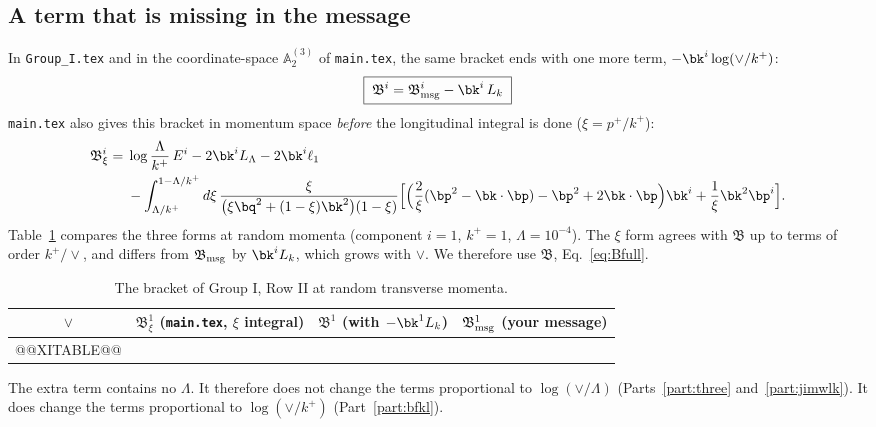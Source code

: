 \subsection{A term that is missing in the message}\label{sec:ft-missing}
In \texttt{Group\_I.tex} and in the coordinate-space $\mathbb A^{(3)}_2$ of \texttt{main.tex}, the same bracket ends with one more term, $-\bk^i\log(\vee/k^+)$:
\begin{equation}
\boxed{\;\mathfrak B^i=\mathfrak B^i_{\rm msg}-\bk^i\,L_k\;}
\label{eq:Bfull}
\end{equation}
\texttt{main.tex} also gives this bracket in momentum space \emph{before} the longitudinal integral is done ($\xi=p^+/k^+$):
\begin{align}
\mathfrak B^i_\xi={}&\log\frac{\Lambda}{k^+}\,E^i-2\bk^iL_\Lambda-2\bk^i\ell_1\notag\\
&-\int_{\Lambda/k^+}^{1-\Lambda/k^+}d\xi\,\frac{\xi}{\big(\xi\bq^2+(1-\xi)\bk^2\big)(1-\xi)}\Big[\Big(\frac2\xi(\bp^2-\bk\cdot\bp)-\bp^2+2\bk\cdot\bp\Big)\bk^i+\frac1\xi\bk^2\bp^i\Big].
\label{eq:Bxi}
\end{align}
Table~\ref{tab:xi} compares the three forms at random momenta (component $i=1$, $k^+=1$, $\Lambda=10^{-4}$). The $\xi$ form agrees with $\mathfrak B$ up to terms of order $k^+/\vee$, and differs from $\mathfrak B_{\rm msg}$ by $\bk^iL_k$, which grows with $\vee$. We therefore use $\mathfrak B$, Eq.~\eqref{eq:Bfull}.
\begin{table}[H]
\centering\small
\begin{tabular}{@{}c c c c@{}}
$\vee$ & $\mathfrak B^1_\xi$ (\texttt{main.tex}, $\xi$ integral) & $\mathfrak B^1$ (with $-\bk^1L_k$) & $\mathfrak B^1_{\rm msg}$ (your message)\\ \hline
@@XITABLE@@
\end{tabular}
\caption{The bracket of Group I, Row II at random transverse momenta.}
\label{tab:xi}
\end{table}
The extra term contains no $\Lambda$. It therefore does not change the terms proportional to $\log(\vee/\Lambda)$ (Parts~\ref{part:three} and~\ref{part:jimwlk}). It does change the terms proportional to $\log(\vee/k^+)$ (Part~\ref{part:bfkl}).

